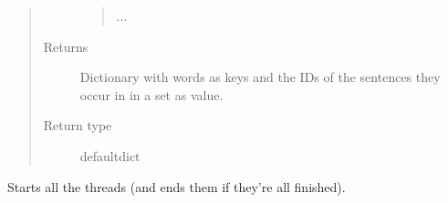 \documentclass[letterpaper,10pt,english]{sphinxmanual}
\begin{document}
\begin{fulllineitems}
\begin{fulllineitems}
\begin{quote}
\begin{description}
\begin{quote}
\begin{itemize}
\end{itemize}

...
\end{quote}


\item[{Returns}] \leavevmode
Dictionary with words as keys and the IDs of the sentences they occur in in a set as value.

\item[{Return type}] \leavevmode
defaultdict

\end{description}\end{quote}

\end{fulllineitems}


\begin{fulllineitems}
\label{src.mapping:src.mapping.mapthreading.MappingMasterThread.start_threads}
Starts all the threads (and ends them if they're all finished).

\end{fulllineitems}


\end{fulllineitems}

\end{document}
